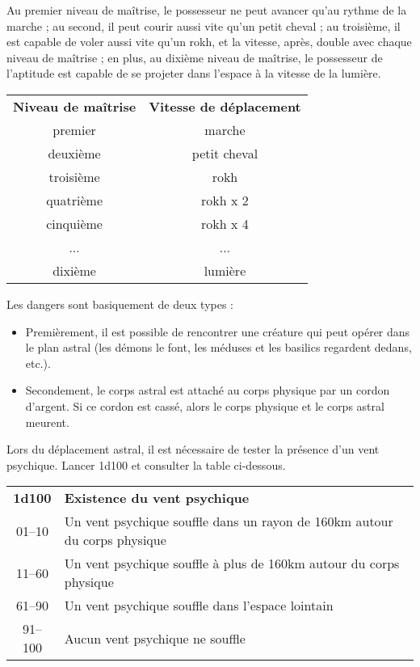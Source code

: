 \bigskip

Au premier niveau de maîtrise, le possesseur ne peut avancer qu'au rythme de la marche ; au second, il peut courir aussi vite qu'un petit cheval ; au troisième, il est capable de voler aussi vite qu'un rokh, et la vitesse, après, double avec chaque niveau de maîtrise ; en plus, au dixième niveau de maîtrise, le possesseur de l'aptitude est capable de se projeter dans l'espace à la vitesse de la lumière.

\bigskip
\begin{tabular}{cc}
\textbf{Niveau de maîtrise} & \textbf{Vitesse de déplacement} \\
premier     & marche \\
deuxième    & petit cheval \\
troisième   & rokh \\
quatrième   & rokh x 2 \\
cinquième   & rokh x 4 \\
...         & ... \\
dixième     & lumière \\
\end{tabular}

\bigskip

Les dangers sont basiquement de deux types :

\bigskip

\begin{itemize}
\item Premièrement, il est possible de rencontrer une créature qui peut opérer dans le plan astral (les démons le font, les méduses et les basilics regardent dedans, etc.).
\item Secondement, le corps astral est attaché au corps physique par un cordon d'argent. Si ce cordon est cassé, alors le corps physique et le corps astral meurent.
\end{itemize}

\bigskip

Lors du déplacement astral, il est nécessaire de tester la présence d'un vent psychique. Lancer 1d100 et consulter la table ci-dessous.

\bigskip

\begin{tabular}{cl}
\textbf{1d100} & \textbf{Existence du vent psychique} \\
01--10 & Un vent psychique souffle dans un rayon de 160km autour du corps physique \\
11--60 & Un vent psychique souffle à plus de 160km autour du corps physique \\
61--90 & Un vent psychique souffle dans l'espace lointain \\
91--100 & Aucun vent psychique ne souffle \\
\end{tabular}

